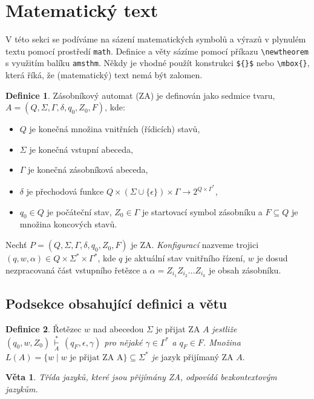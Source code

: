 \documentclass[twocolumn,a4paper,11pt]{article}
\theoremstyle{definition}
\newtheorem{definice}{Definice}[]
\theoremstyle{plain}
\newtheorem{veta}{Věta}
\begin{document}
\section{Matematický text}
\label{sec:mattext}
V této sekci se podíváme na sázení matematických symbolů a výrazů v plynulém textu pomocí prostředí \verb|math|.
Definice a věty sázíme pomocí příkazu \verb|\newtheorem| s využitím balíku \verb|amsthm|.
Někdy je vhodné použít konstrukci \verb|${}$| nebo \verb|\mbox{}|, která říká, že (matematický) text nemá být zalomen.
\begin{definice}\label{def:ZA} Zásobníkový automat (ZA) je definován jako sedmice tvaru, $A = (Q, \Sigma, \Gamma, \delta, q_0 , Z_0 , F)$, kde: \begin{itemize} \item $Q$ je konečná množina vnitřních (řídicích) stavů, \item $\Sigma$ je konečná vstupní abeceda, \item $\Gamma$ je konečná zásobníková abeceda, \item $\delta$ je přechodová funkce $Q \times (\Sigma \cup \{\epsilon\}) \times \Gamma \rightarrow 2^{Q \times \Gamma^*}$, \item $q_0 \in Q$ je počáteční stav, $Z_0 \in \Gamma$ je startovací symbol zásobníku a $F \subseteq Q$ je množina koncových stavů.\end{itemize}
\par Nechť $P = (Q,\Sigma,\Gamma,\delta,q_0,Z_0,F)$ je ZA. \emph{Konfigurací} nazveme trojici $(q,w,\alpha) \in Q \times \Sigma^*\times \Gamma^*$, kde $q$ je aktuální stav vnitřního řízení, $w$ je dosud nezpracovaná část vstupního řetězce a $\alpha = Z_{i_1}Z_{i_2}\dots Z_{i_k}$ je obsah zásobníku.
\end{definice}

\subsection{Podsekce obsahující definici a větu}
\begin{definice}\label{def:retezec} Řetězec $w$ nad abecedou $\Sigma$ je přijat ZA $A$ \textit{jestliže $(q_0,w,Z_0)\,\underset{A}{\overset{*}{\vdash}}\,(q_F,\epsilon,\gamma)$ pro nějaké $\gamma \in \Gamma^*$ a $q_F \in F$. Množina $L(A) = \{w \mid w \text{ je přijat ZA A}\} \subseteq \Sigma^*$ je} jazyk přijímaný ZA $A$.\end{definice}

\begin{veta}Třída jazyků, které jsou přijímány ZA, odpovídá bezkontextovým jazykům.\end{veta}
\end{document}
